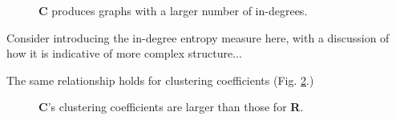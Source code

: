 \documentclass[twoside,twocolumn]{article}
\begin{document}
\begin{figure}
  \caption{\textbf{C} produces graphs with a larger number of in-degrees.}
  \label{fig:figB}
\end{figure}

Consider introducing the in-degree entropy measure here, with a discussion
of how it is indicative of more complex structure...

The same relationship holds for clustering coefficients (Fig. \ref{fig:figDd1024}.)

\begin{figure}
  \caption{\textbf{C}'s clustering coefficients are larger than those for \textbf{R}.}
  \label{fig:figDd1024}
\end{figure}
\end{document}
